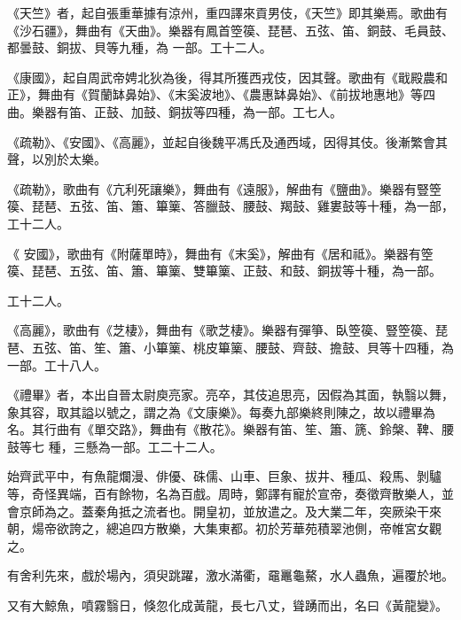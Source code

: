 \begin{pinyinscope}
 《天竺》者，起自張重華據有涼州，重四譯來貢男伎，《天竺》即其樂焉。歌曲有《沙石疆》，舞曲有《天曲》。樂器有鳳首箜篌、琵琶、五弦、笛、銅鼓、毛員鼓、都曇鼓、銅拔、貝等九種，為
 一部。工十二人。



 《康國》，起自周武帝娉北狄為後，得其所獲西戎伎，因其聲。歌曲有《戢殿農和正》，舞曲有《賀蘭缽鼻始》、《末奚波地》、《農惠缽鼻始》、《前拔地惠地》等四曲。樂器有笛、正鼓、加鼓、銅拔等四種，為一部。工七人。



 《疏勒》、《安國》、《高麗》，並起自後魏平馮氏及通西域，因得其伎。後漸繁會其聲，以別於太樂。



 《疏勒》，歌曲有《亢利死讓樂》，舞曲有《遠服》，解曲有《鹽曲》。樂器有豎箜篌、琵琶、五弦、笛、簫、篳篥、答臘鼓、腰鼓、羯鼓、雞婁鼓等十種，為一部，工十二人。



 《
 安國》，歌曲有《附薩單時》，舞曲有《末奚》，解曲有《居和祗》。樂器有箜篌、琵琶、五弦、笛、簫、篳篥、雙篳篥、正鼓、和鼓、銅拔等十種，為一部。



 工十二人。



 《高麗》，歌曲有《芝棲》，舞曲有《歌芝棲》。樂器有彈箏、臥箜篌、豎箜篌、琵琶、五弦、笛、笙、簫、小篳篥、桃皮篳篥、腰鼓、齊鼓、擔鼓、貝等十四種，為一部。工十八人。



 《禮畢》者，本出自晉太尉庾亮家。亮卒，其伎追思亮，因假為其面，執翳以舞，象其容，取其謚以號之，謂之為《文康樂》。每奏九部樂終則陳之，故以禮畢為名。其行曲有《單交路》，舞曲有《散花》。樂器有笛、笙、簫、篪、鈴槃、鞞、腰鼓等七
 種，三懸為一部。工二十二人。



 始齊武平中，有魚龍爛漫、俳優、硃儒、山車、巨象、拔井、種瓜、殺馬、剝驢等，奇怪異端，百有餘物，名為百戲。周時，鄭譯有寵於宣帝，奏徵齊散樂人，並會京師為之。蓋秦角抵之流者也。開皇初，並放遣之。及大業二年，突厥染干來朝，煬帝欲誇之，總追四方散樂，大集東都。初於芳華苑積翠池側，帝帷宮女觀之。



 有舍利先來，戲於場內，須臾跳躍，激水滿衢，黿鼉龜鰲，水人蟲魚，遍覆於地。



 又有大鯨魚，噴霧翳日，倏忽化成黃龍，長七八丈，聳踴而出，名曰《黃龍變》。




\end{pinyinscope}
